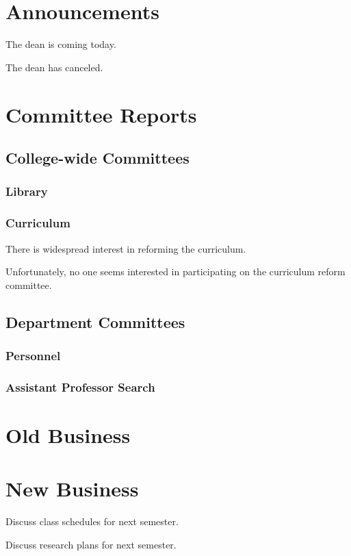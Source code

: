 \documentclass[11pt,mins]{meetingmins}
\begin{document}
\maketitle
\section{Announcements}
\begin{hiddenitems}
\item
The dean is coming today.
\item
The dean has canceled.
\end{hiddenitems}
\section{Committee Reports}
\subsection{College-wide Committees}
\subsubsection{Library}
\subsubsection{Curriculum}
\begin{hiddensubitems}
\item
There is widespread interest in reforming
the curriculum.
\item
Unfortunately, no one seems interested
in participating on the curriculum
reform committee.
\end{hiddensubitems}
\subsection{Department Committees}
\subsubsection{Personnel}
\subsubsection{Assistant Professor Search}

\section{Old Business}
\begin{items}
\item
\priormins
\end{items}
\section{New Business}
\begin{items}
\item
Discuss class schedules for next semester.
\item
Discuss research plans for next semester.
\end{items}
\vspace{1em}
\end{document}
